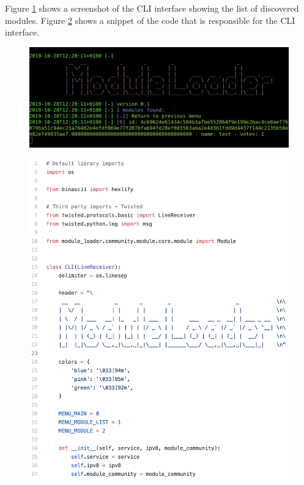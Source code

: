 Figure \ref{fig:cli-interface} shows a screenshot of the CLI interface showing the list of discovered modules. Figure \ref{fig:cli-code} shows a snippet of the code that is responsible for the CLI interface.

\begin{figure}[h!]
	\centering
	\includegraphics[width=\textwidth]{images/cli-interface.png}
	\caption{\label{fig:cli-interface}}
\end{figure}

\begin{figure}[h!]
	\centering
	\includegraphics[width=\textwidth]{images/code-cli.png}
	\caption{\label{fig:cli-code}}
\end{figure}

